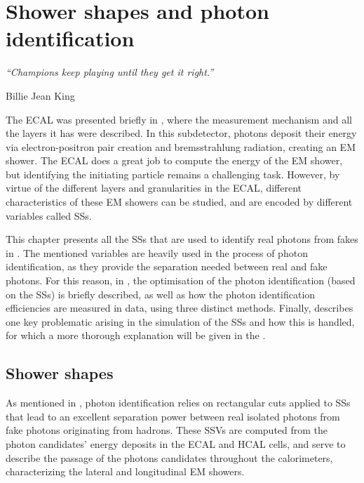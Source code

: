 \chapter{Shower shapes and photon identification}
\label{ch:pid_ss}
\epigraph{\emph{“Champions keep playing until they get it right.”}}{Billie Jean King}


The \ac{ECAL} was presented briefly in \Sect{\ref{subsubsec:atlas:atlas:cals:ecal}}, where the measurement mechanism and all the layers it has were described. In this subdetector, photons deposit their energy via electron-positron pair creation and bremsstrahlung radiation, creating an \ac{EM} shower. The \ac{ECAL} does a great job to compute the energy of the \ac{EM} shower, but identifying the initiating particle remains a challenging task. 
However, by virtue of the different layers and granularities in the \ac{ECAL}, different characteristics of these \ac{EM} showers can be studied, and are encoded by different variables called \acfp{SS}.

This chapter presents all the \acp{SS} that are used to identify real photons from fakes in \Sect{\ref{sec:pid_ss:ss}}. The mentioned variables are heavily used in the process of photon identification, as they provide the separation needed between real and fake photons. For this reason, in \Sect{\ref{sec:pid_ss:pid}}, the optimisation of the photon identification (based on the \acp{SS}) is briefly described, as well as how the photon identification efficiencies are measured in data, using three distinct methods. Finally, \Sect{\ref{sec:pid_ss:ss_differences}} describes one key problematic arising in the simulation of the \acp{SS} and how this is handled, for which a more thorough explanation will be given in the \Ch{\ref{ch:ss_corrections}}.






\section{Shower shapes}
\label{sec:pid_ss:ss}

As mentioned in \Sect{\ref{subsec:objects:egamma:id}}, photon identification relies on rectangular cuts applied to \acp{SS} that lead to an excellent separation power between real isolated photons from fake photons originating from hadrons. These \acp{SSV} are computed from the photon candidates' energy deposits in the \ac{ECAL} and \ac{HCAL} cells, and serve to describe the passage of the photons candidates throughout the calorimeters, characterizing the lateral and longitudinal \ac{EM} showers.

